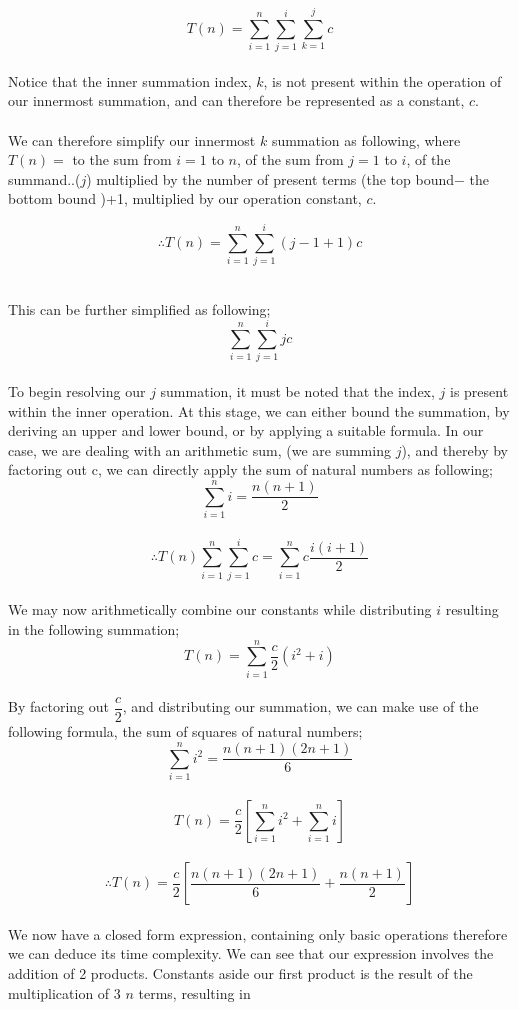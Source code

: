 \documentclass[a4paper]{article}
\begin{document}
$$T(n) = \sum_{i=1}^n \sum_{j=1}^i \sum_{k=1}^j c$$\\
Notice that the inner summation index, $k$, is not present within the operation of our innermost summation,
and can therefore be represented as a constant, $c$.\\
\\We can therefore simplify our innermost $k$ summation as following, where $T(n) = $ to the sum from $i=1$ to $n$,
of the sum from $j=1$ to $i$, of the summand..($j$) multiplied by the number of present terms (the top bound$-$ the 
bottom bound )+1, multiplied by our operation constant, $c$.

$$ \therefore T(n) = \sum_{i=1}^n \sum_{j=1}^i(j-1+1)c  $$\

This can be further simplified as following; \\
$$  \sum_{i=1}^n \sum_{j=1}^ijc  $$ \\
To begin resolving our $j$ summation, it must be noted that the index, $j$ is present within the inner operation. 
At this stage, we can either bound the summation, by deriving an upper and lower bound, or by applying a suitable formula. 
In our case, we are dealing with an arithmetic sum, (we are summing $j$), and thereby by factoring out c, we can directly apply
the sum of natural numbers as following; \\
$$ \sum_{i=1}^n i = \dfrac {n(n+1)}{2} $$\\
$$ \therefore T(n) \sum_{i=1}^n \sum_{j=1}^ic = \sum_{i=1}^nc \dfrac{i(i+1)}{2} $$\\ 
We may now arithmetically combine our constants while distributing $i$ resulting in the following summation; \\
$$ T(n) = \sum_{i=1}^n \dfrac {c}{2}(i^2+i) $$\\
By factoring out $\dfrac{c}{2}$, and distributing our summation, we can make use of the following formula, the sum of squares of natural numbers; \\
$$ \sum_{i=1}^n i^2 = \dfrac{n(n+1)(2n+1)}{6} $$ \\
$$ T(n) = \dfrac{c}{2} \left[ \sum_{i=1}^n i^2 + \sum_{i=1}^n i \right] $$ \\
$$ \therefore T(n) = \dfrac{c}{2} \left[ \dfrac{n(n+1)(2n+1)}{6} + \dfrac{n(n+1)}{2} \right] $$\\
We now have a closed form expression, containing only basic operations therefore we can deduce its time complexity. We can see that 
our expression involves the addition of 2 products. Constants aside our first product is the result of the multiplication of 3 $n$ terms, resulting in 
\end{document}
